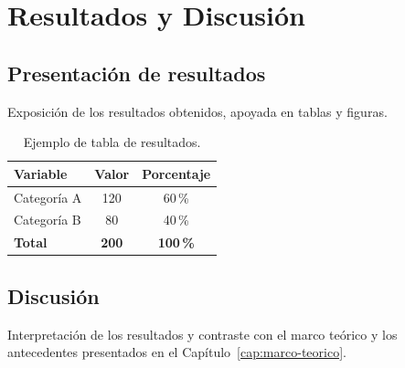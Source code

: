 \chapter{Resultados y Discusión}
\label{cap:resultados}

\section{Presentación de resultados}

Exposición de los resultados obtenidos, apoyada en tablas y figuras.


\begin{table}[H]
  \centering
  \caption{Ejemplo de tabla de resultados.}
  \label{tab:ejemplo}
  \begin{tabular}{lcc}
    \toprule
    \textbf{Variable} & \textbf{Valor} & \textbf{Porcentaje} \\
    \midrule
    Categoría A & 120 & 60\,\% \\
    Categoría B & 80  & 40\,\% \\
    \midrule
    \textbf{Total} & \textbf{200} & \textbf{100\,\%} \\
    \bottomrule
  \end{tabular}
\end{table}

\section{Discusión}

Interpretación de los resultados y contraste con el marco teórico y los
antecedentes presentados en el Capítulo~\ref{cap:marco-teorico}.
